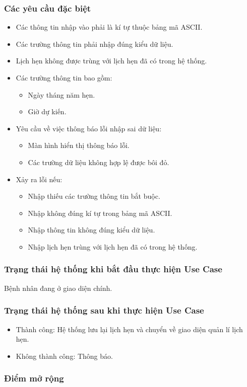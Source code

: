 \subsubsection{Các yêu cầu đặc biệt}
\begin{itemize}
  \item Các thông tin nhập vào phải là kí tự thuộc bảng mã ASCII.
  \item Các trường thông tin phải nhập đúng kiểu dữ liệu.
  \item Lịch hẹn không được trùng với lịch hẹn đã có trong hệ thống.
  \item Các trường thông tin bao gồm:
  \begin{itemize}
    \item Ngày tháng năm hẹn.
    \item Giờ dự kiến.
  \end{itemize}
  \item Yêu cầu về việc thông báo lỗi nhập sai dữ liệu:
  \begin{itemize}
    \item Màn hình hiển thị thông báo lỗi.
    \item Các trường dữ liệu không hợp lệ được bôi đỏ.
  \end{itemize}
  \item Xảy ra lỗi nếu:
  \begin{itemize}
    \item Nhập thiếu các trường thông tin bắt buộc.
    \item Nhập không đúng kí tự trong bảng mã ASCII.
    \item Nhập thông tin không đúng kiểu dữ liệu.
    \item Nhập lịch hẹn trùng với lịch hẹn đã có trong hệ thống.
  \end{itemize}
\end{itemize}

\subsubsection{Trạng thái hệ thống khi bắt đầu thực hiện Use Case}
Bệnh nhân đang ở giao diện chính.

\subsubsection{Trạng thái hệ thống sau khi thực hiện Use Case}
\begin{itemize}
  \item Thành công: Hệ thống lưu lại lịch hẹn và chuyển về giao diện quản lí lịch hẹn.
  \item Không thành công: Thông báo.
\end{itemize}

\subsubsection{Điểm mở rộng}